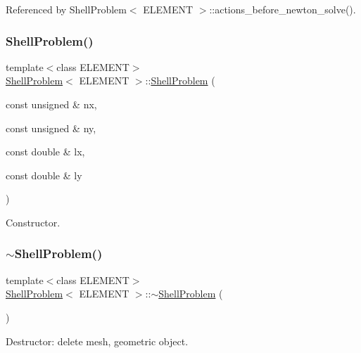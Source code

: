 Referenced by Shell\+Problem$<$ E\+L\+E\+M\+E\+N\+T $>$\+::actions\+\_\+before\+\_\+newton\+\_\+solve().

\mbox{\label{classShellProblem_a1ec644498c95acea00cc05c5bd30d075}} 
\subsubsection{\texorpdfstring{Shell\+Problem()}{ShellProblem()}\hspace{0.1cm}{\footnotesize\ttfamily [2/2]}}
{\footnotesize\ttfamily template$<$class E\+L\+E\+M\+E\+NT$>$ \\
\hyperlink{classShellProblem}{Shell\+Problem}$<$ E\+L\+E\+M\+E\+NT $>$\+::\hyperlink{classShellProblem}{Shell\+Problem} (\begin{DoxyParamCaption}\item[{const unsigned \&}]{nx,  }\item[{const unsigned \&}]{ny,  }\item[{const double \&}]{lx,  }\item[{const double \&}]{ly }\end{DoxyParamCaption})}



Constructor. 

\mbox{\label{classShellProblem_afb893165e8a3695d416f852bff5b3280}} 
\subsubsection{\texorpdfstring{$\sim$\+Shell\+Problem()}{~ShellProblem()}}
{\footnotesize\ttfamily template$<$class E\+L\+E\+M\+E\+NT$>$ \\
\hyperlink{classShellProblem}{Shell\+Problem}$<$ E\+L\+E\+M\+E\+NT $>$\+::$\sim$\hyperlink{classShellProblem}{Shell\+Problem} (\begin{DoxyParamCaption}{ }\end{DoxyParamCaption})\hspace{0.3cm}{\ttfamily [inline]}}



Destructor\+: delete mesh, geometric object. 



